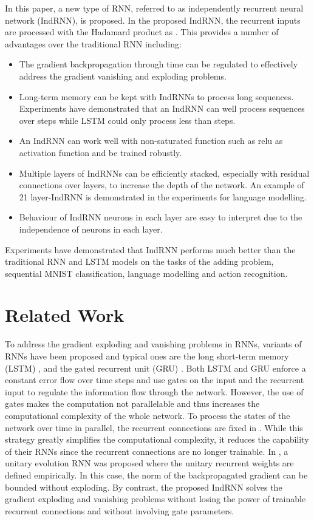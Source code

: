 \documentclass[10pt,twocolumn,letterpaper]{article}
\begin{document}
In this paper, a new type of RNN, referred to as independently recurrent neural network (IndRNN), is proposed. In the proposed IndRNN, the recurrent inputs are processed with the Hadamard product as . This provides a number of advantages over the traditional RNN including:

\begin{itemize}
\item The gradient backpropagation through time can be regulated to effectively address the gradient vanishing and exploding problems.
\item Long-term memory can be kept with IndRNNs to process long sequences. Experiments have demonstrated that an IndRNN can well process sequences over  steps while LSTM could only process less than  steps.
\item An IndRNN can work well with non-saturated function such as relu as activation function and be trained robustly. 
\item Multiple layers of IndRNNs can be efficiently stacked, especially with residual connections over layers, to increase the depth of the network. An example of 21 layer-IndRNN is demonstrated in the experiments for language modelling.
\item Behaviour of IndRNN neurons in each layer are easy to interpret due to the independence of neurons in each layer.
\end{itemize}
Experiments have demonstrated that IndRNN performs much better than the traditional RNN and LSTM models on the tasks of the adding problem, sequential MNIST classification, language modelling and action recognition.

\vspace{0.5cm}
\section{Related Work}
To address the gradient exploding and vanishing problems in RNNs, variants of RNNs have been proposed and typical ones are the long short-term memory (LSTM) \cite{hochreiter1997long}, and the gated recurrent unit (GRU) \cite{cho2014learning}. Both LSTM and GRU enforce a constant error flow over time steps and use gates on the input and the recurrent input to regulate the information flow through the network. However, the use of gates makes the computation not parallelable and thus increases the computational complexity of the whole network. To process the states of the network over time in parallel, the recurrent connections are fixed in \cite{bradbury2016quasi,lei2017training}. While this strategy greatly simplifies the computational complexity, it reduces the capability of their RNNs since the recurrent connections are no longer trainable. In \cite{arjovsky2015unitary, wisdom2016full}, a unitary evolution RNN was proposed where the unitary recurrent weights are defined empirically. In this case, the norm of the backpropagated gradient can be bounded without exploding. By contrast, the proposed IndRNN solves the gradient exploding and vanishing problems without losing the power of trainable recurrent connections and without involving gate parameters. 
\end{document}
